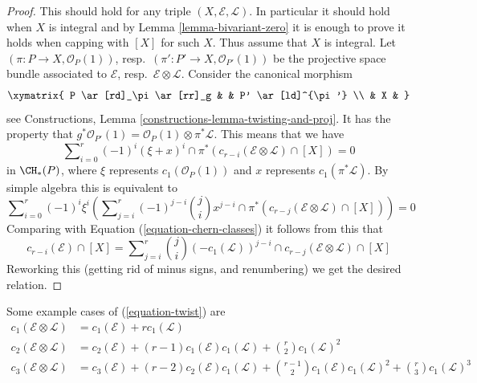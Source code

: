 \begin{proof}
This should hold for any triple $(X, \mathcal{E}, \mathcal{L})$.
In particular it should hold when $X$ is integral and by
Lemma \ref{lemma-bivariant-zero}
it is enough to prove
it holds when capping with $[X]$ for such $X$. Thus assume
that $X$ is integral. Let $(\pi : P \to X, \mathcal{O}_P(1))$,
resp.\ $(\pi' : P' \to X, \mathcal{O}_{P'}(1))$ be the
projective space bundle associated to $\mathcal{E}$,
resp.\ $\mathcal{E} \otimes \mathcal{L}$. Consider the canonical morphism
$$
\xymatrix{
P \ar[rd]_\pi \ar[rr]_g & & P' \ar[ld]^{\pi'} \\
& X &
}
$$
see Constructions, Lemma \ref{constructions-lemma-twisting-and-proj}.
It has the property that
$g^*\mathcal{O}_{P'}(1)
= \mathcal{O}_P(1) \otimes \pi^* {\mathcal L}$.
This means that we have
$$
\sum\nolimits_{i = 0}^r
(-1)^i
(\xi + x)^i \cap \pi^*(c_{r - i}(\mathcal{E} \otimes \mathcal{L}) \cap [X])
=
0
$$
in $\CH_*(P)$, where $\xi$ represents
$c_1(\mathcal{O}_P(1))$ and $x$
represents $c_1(\pi^*\mathcal{L})$. By simple algebra this
is equivalent to
$$
\sum\nolimits_{i = 0}^r
(-1)^i \xi^i \left(
\sum\nolimits_{j = i}^r
(-1)^{j - i}
\binom{j}{i}
x^{j - i} \cap
\pi^*(c_{r - j}(\mathcal{E} \otimes \mathcal{L}) \cap [X])
\right)
=
0
$$
Comparing with
Equation (\ref{equation-chern-classes}) it follows from this that
$$
c_{r - i}(\mathcal{E}) \cap [X] =
\sum\nolimits_{j = i}^r
\binom{j}{i}
(-c_1(\mathcal{L}))^{j - i} \cap
c_{r - j}(\mathcal{E} \otimes \mathcal{L}) \cap [X]
$$
Reworking this (getting rid of minus signs, and renumbering) we get
the desired relation.
\end{proof}

\noindent
Some example cases of (\ref{equation-twist}) are
\begin{align*}
c_1(\mathcal{E} \otimes \mathcal{L})
& =
c_1(\mathcal{E}) +
r c_1(\mathcal{L}) \\
c_2(\mathcal{E} \otimes \mathcal{L})
& =
c_2(\mathcal{E}) +
(r - 1) c_1(\mathcal{E}) c_1(\mathcal{L}) +
\binom{r}{2} c_1(\mathcal{L})^2 \\
c_3(\mathcal{E} \otimes \mathcal{L})
& =
c_3(\mathcal{E}) +
(r - 2) c_2(\mathcal{E})c_1(\mathcal{L}) +
\binom{r - 1}{2} c_1(\mathcal{E})c_1(\mathcal{L})^2 +
\binom{r}{3} c_1(\mathcal{L})^3
\end{align*}








